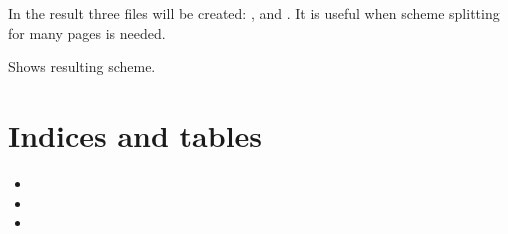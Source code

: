\documentclass[letterpaper,10pt,english]{sphinxmanual}
\begin{document}
\begin{fulllineitems}
\begin{fulllineitems}
%
\begin{sphinxVerbatim}[commandchars=\\\{\}]
  
  
  
\end{sphinxVerbatim}

In the result three files will be created: ,  and .
It is useful when scheme splitting for many pages is needed.

\end{fulllineitems}


\begin{fulllineitems}
\label{\detokenize{nice_scheme_plotter:nice_scheme_plotter.Scheme.show}}
Shows resulting scheme.

\end{fulllineitems}


\end{fulllineitems}



\chapter{Indices and tables}
\label{\detokenize{nice_scheme_plotter:indices-and-tables}}\begin{itemize}
\item {} 

\item {} 

\item {} 

\end{itemize}
\end{document}
